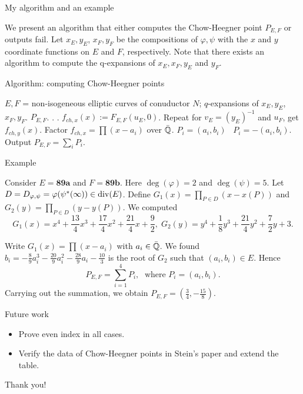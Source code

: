 \documentclass[handout]{beamer}
\begin{document}
\begin{frame}{My algorithm and an example}

We present an algorithm that either computes the Chow-Heegner point $P_{E,F}$ or outputs fail. Let $x_E, y_E$, $x_F,y_F$ be the compositions of $\varphi, \psi$ with the $x$ and $y$ coordinate functions on $E$ and $F$, respectively. Note that there exists an algorithm to compute the q-expansions of $x_E,x_F,y_E$ and $y_F$.  

\end{frame}

\begin{frame}{Algorithm: computing Chow-Heegner points}
\begin{algorithm}[H]
\begin{algorithmic}              %
    \Require  $E, F$  = non-isogeneous elliptic curves of conuductor $N$;
    $q$-expansions of $x_E, y_E$, $x_F,y_F$.
    \Ensure $P_{E,F}$.
        .
    .
    \State $f_{ch,x}(x) := F_{E,F}(u_E,0)$.
    \State Repeat for $v_E = (y_E)^{-1}$ and $u_F$, get $f_{ch,y}(x)$.
    \State Factor $f_{ch,x} = \prod (x-a_i)$ over $\bar{\mathbb{Q}}$.
      $P_i = (a_i,b_i)$ \Else  \,  $P_i = - (a_i, b_i)$.
    \EndIf
    \EndFor
\State Output $P_{E,F} = \sum_i P_i$.
\end{algorithmic}
\end{algorithm}
\end{frame}

\begin{frame}{Example}

\begin{Example}
Consider $E = \textbf{89a}$ and $F = \textbf{89b}$. Here $\deg(\varphi) = 2$ and $\deg(\psi) = 5$. Let 
$D = D_{\varphi, \psi}= \varphi(\psi^*(\infty)) \in \operatorname{div}(E)$. Define $G_1(x) = \prod_{P \in D} (x - x(P))$ 
and $G_2(y) = \prod_{P \in D} (y - y(P))$. We computed 
\[
G_1(x) = x^{4} + \frac{13}{4} x^{3} + \frac{17}{4} x^{2} + \frac{21}{4} x + \frac{9}{2}, \; G_2(y) = y^{4} + \frac{1}{8} y^{3} + \frac{21}{4} y^{2} + \frac{7}{2} y + 3.
\]

Write $G_1(x) = \prod (x-a_i)$ with $a_i \in \bar{\mathbb{Q}}$. We found  $b_i = -\frac{8}{9} a_i^{3} - \frac{20}{9} a_i^{2} - \frac{28}{9} a_i - \frac{10}{3}$ is the root of $G_2$ such that $(a_i,b_i) \in E$. Hence 
	$$P_{E,F} = \sum_{i=1}^4 P_i, \; \mbox{ where } P_i = (a_i, b_i).$$
Carrying out the summation, we obtain $P_{E,F} = (\frac{3}{4},-\frac{15}{8})$. 

\end{Example}


\end{frame}

\begin{frame}{Future work}

\begin{itemize}
\item Prove even index in all cases. 
\item Verify the data of Chow-Heegner points in Stein's paper and extend the table.
\end{itemize}

\end{frame}

\begin{frame}
\Huge{\centerline{Thank you!}}
\end{frame}
\end{document}
